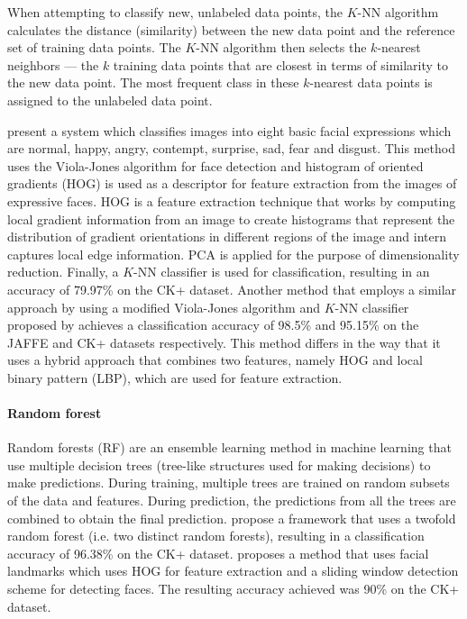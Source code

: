 \documentclass[12pt, a4paper]{article}
\newcommand{\np}
    {
    \vskip 0.4cm
    }
\begin{document}
When attempting to classify new, unlabeled data points, the $K$-NN algorithm calculates the distance (similarity) between the new data point and the reference set of training data points. The $K$-NN algorithm then selects the $k$-nearest neighbors --- the $k$ training data points that are closest in terms of similarity to the new data point. The most frequent class in these $k$-nearest data points is assigned to the unlabeled data point.
\np
\cite{dino2019facial} present a system which classifies images into eight basic facial expressions which are normal, happy, angry, contempt, surprise, sad, fear and disgust. This method uses the Viola-Jones algorithm \citep{viola2001rapid} for face detection and histogram of oriented gradients (HOG) is used as a descriptor for feature extraction from the images of expressive faces. HOG is a feature extraction technique that works by computing local gradient information from an image to create histograms that represent the distribution of gradient orientations in different regions of the image and intern captures local edge information. PCA is applied for the purpose of dimensionality reduction. Finally, a $K$-NN classifier is used for classification, resulting in an accuracy of 79.97\% on the CK+ dataset. Another method that employs a similar approach by using a modified Viola-Jones algorithm and $K$-NN classifier proposed by \cite{yadav2020facial} achieves a classification accuracy of 98.5\% and 95.15\% on the JAFFE and CK+ datasets respectively. This method differs in the way that it uses a hybrid approach that combines two features, namely HOG and local binary pattern (LBP), which are used for feature extraction.

\paragraph{Random forest}

Random forests (RF) are an ensemble learning method in machine learning that use multiple decision trees (tree-like structures used for making decisions) to make predictions. During training, multiple trees are trained on random subsets of the data and features. During prediction, the predictions from all the trees are combined to obtain the final prediction. \cite{pu2015facial} propose a framework that uses a twofold random forest (i.e. two distinct random forests), resulting in a classification accuracy of 96.38\% on the CK+ dataset. \cite{munasinghe2018facial} proposes a method that uses facial landmarks which uses HOG for feature extraction and a sliding window detection scheme for detecting faces. The resulting accuracy achieved was 90\% on the CK+ dataset.
\end{document}
